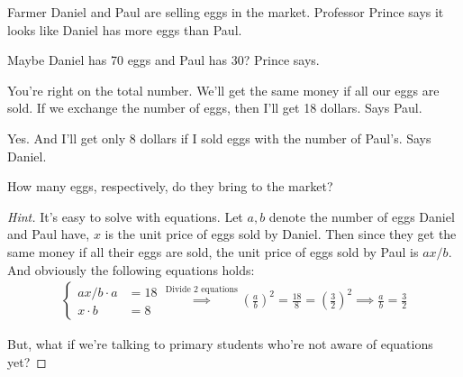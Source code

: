 \begin{example}
  Farmer Daniel and Paul are selling eggs in the market. Professor Prince says it looks like Daniel has more eggs than Paul.

  Maybe Daniel has 70 eggs and Paul has 30? Prince says.

  You're right on the total number. We'll get the same money if all our eggs are sold. If we exchange the number of eggs, then I'll get 18 dollars. Says Paul.

  Yes. And I'll get only 8 dollars if I sold eggs with the number of Paul's. Says Daniel.

  How many eggs, respectively, do they bring to the market?
\end{example}
\begin{proof}[Hint]
  It's easy to solve with equations. Let $a,b$ denote the number of eggs Daniel and Paul have, $x$ is the unit price of eggs sold by Daniel. Then since they get the same money if all their eggs are sold, the unit price of eggs sold by Paul is $ax/b$. And obviously the following equations holds:
  \begin{align*}
    \begin{cases}
      ax/b\cdot a &=18\\
      x\cdot b    &= 8
    \end{cases} \overset{\text{Divide 2 equations}}{\implies}
    \left(\frac ab\right)^2=\frac{18}{8}=\left(\frac{3}{2}\right)^2
    \implies \frac ab=\frac32
  \end{align*}

  {\color{red}But, what if we're talking to primary students who're not aware of equations yet?}
\end{proof}
